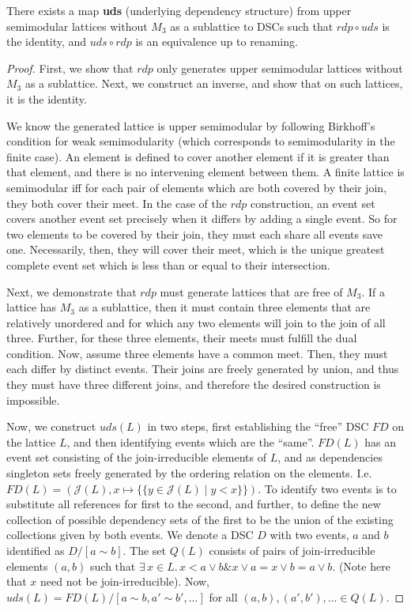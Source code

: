 \documentclass[a4paper,USenglish,cleveref, autoref, thm-restate,authorcolumns]{lipics-v2019}
\newcommand{\Jc}{\mathcal{J}}
\newcommand{\band}{\mathop{\&}}
\begin{document}
\begin{theorem}
\label{representation}
There exists a map \textbf{uds} (underlying dependency structure) from upper semimodular lattices without \(M_3\) as a sublattice to DSCs such that  \(rdp \circ uds\) is the identity, and \(uds \circ rdp\) is an equivalence up to renaming.
\end{theorem}

\begin{proof}
First, we show that \(rdp\) only generates upper semimodular lattices without \(M_3\) as a sublattice. Next, we construct an inverse, and show that on such lattices, it is the identity.

We know the generated lattice is upper semimodular by following Birkhoff's condition for weak semimodularity (which corresponds to semimodularity in the finite case). An element is defined to cover another element if it is greater than that element, and there is no intervening element between them. A finite lattice is semimodular iff for each pair of elements which are both covered by their join, they both cover their meet. In the case of the \(rdp\) construction, an event set covers another event set precisely when it differs by adding a single event. So for two elements to be covered by their join, they must each share all events save one. Necessarily, then, they will cover their meet, which is the unique greatest complete event set which is less than or equal to their intersection.

Next, we demonstrate that \(rdp\) must generate lattices that are free of \(M_3\). If a lattice has \(M_3\) as a sublattice, then it must contain three elements that are relatively unordered and for which any two elements will join to the join of all three. Further, for these three elements, their meets must fulfill the dual condition. Now, assume three elements have a common meet. Then, they must each differ by distinct events.  Their joins are freely generated by union, and thus they must have three different joins, and therefore the desired construction is impossible.

Now, we construct \(uds(L)\) in two steps, first establishing the ``free'' DSC \(FD\) on the lattice \(L\), and then identifying events which are the ``same''. \(FD(L)\) has an event set consisting of the join-irreducible elements of \(L\), and as dependencies singleton sets freely generated by the ordering relation on the elements.  I.e. \(FD(L) = (\Jc(L), x \mapsto \{\{ y \in \Jc(L) \mid y<x\}\})\). To identify two events is to substitute all references for first to the second, and further, to define the new collection of possible dependency sets of the first to be the union of the existing collections given by both events. We denote a DSC \(D\) with two events, \(a\) and \(b\) identified as  \(D/[a\sim b]\). The set \(Q(L)\) consists of pairs of join-irreducible elements \((a,b)\) such that  \(\exists\, x \in L . \,  x < a \vee b \band x \vee a = x \vee b = a \vee b\). (Note here that \(x\) need not be join-irreducible). Now, \(uds(L) = FD(L)/[a \sim b,a' \sim b',...]\) for all \((a,b), (a',b'), ...\in Q(L)\).


\end{proof}
\end{document}
